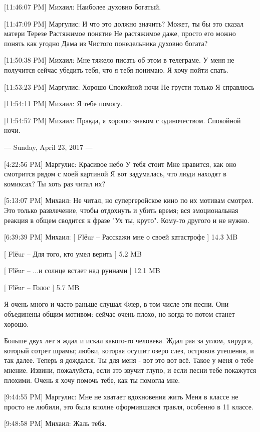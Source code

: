 \documentclass{article}
\begin{document}
[11:46:07 PM] Михаил:
Наиболее духовно богатый.

[11:47:09 PM] Маргулис:
И что это должно значить?
 Может, ты бы это сказал матери Терезе
 Растяжимое понятие
 Не растяжимое даже, просто его можно понять как угодно
 Дама из Чистого понедельника духовно богата?

[11:50:38 PM] Михаил:
Мне тяжело писать об этом в телеграме. У меня не получится сейчас убедить тебя, что я тебя понимаю.
 Я хочу пойти спать.

[11:53:23 PM] Маргулис:
Хорошо
 Спокойной ночи
 Не грусти только
 Я справлюсь

[11:54:11 PM] Михаил:
Я тебе помогу.

[11:54:57 PM] Михаил:
Правда, я хорошо знаком с одиночеством.
 Спокойной ночи.

--- Sunday, April 23, 2017 ---

[4:22:56 PM] Маргулис:
Красивое небо
 У тебя стоит
 Мне нравится, как оно смотрится рядом с моей картиной
 Я вот задумалась, что люди находят в комиксах? Ты хоть раз читал их?

[5:13:07 PM] Михаил:
Не читал, но супергеройское кино по их мотивам смотрел. Это только развлечение, чтобы отдохнуть и убить время; вся эмоциональная реакция в общем сводится к фразе "Ух ты, круто". Кому-то другого и не нужно.

[6:39:39 PM] Михаил:
[ Flёur – Расскажи мне о своей катастрофе  ] 14.3 MB
 
[ Flёur – Для того, кто умел верить  ] 5.2 MB
 
[ Flёur – ...и солнце встает над руинами  ] 12.1 MB
 
[ Flёur – Голос  ] 5.7 MB
 
 Я очень много и часто раньше слушал Флер, в том числе эти песни. Они объединены общим мотивом: сейчас очень плохо, но когда-то потом станет хорошо.

Больше двух лет я ждал и искал какого-то человека. Ждал рая за углом, хирурга, который сотрет шрамы; любви, которая осушит озеро слез, островов утешения, и так далее. Теперь я дождался. Ты для меня - вот это вот всё. Такое у меня о тебе мнение.
 Извини, пожалуйста, если это звучит глупо, и если песни тебе покажутся плохими.
 Очень я хочу помочь тебе, как ты помогла мне.

[9:44:55 PM] Маргулис:
Мне не хватает вдохновения жить
 Меня в классе не просто не любили, это была вполне оформившаяся травля, особенно в 11 классе.

[9:48:58 PM] Михаил:
Жаль тебя.
\end{document}
